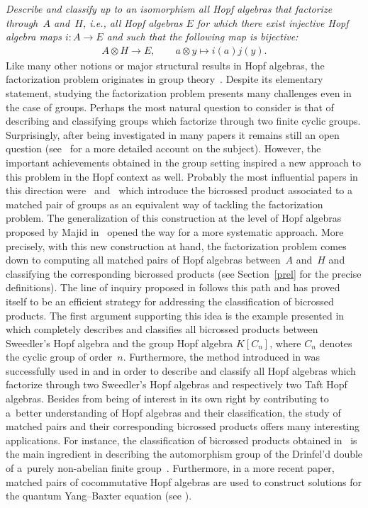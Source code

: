 \documentclass[10pt,a4paper]{amsart}
\numberwithin{equation}{section}
\begin{document}
\textit{Describe and classify up to an isomorphism all Hopf algebras that factorize through~$A$ and~$H$, i.e., all Hopf algebras $E$ for which there exist injective Hopf algebra maps $i\colon A \to E$ and  such that the following map is bijective:}
\begin{gather*}
A \otimes H \to E, \qquad a \otimes y \mapsto i(a) j(y).
\end{gather*}
Like many other notions or major structural results in Hopf algebras, the factorization problem originates in group theory~\cite{Ore}. Despite its elementary statement, studying the factorization problem presents many challenges even in the case of groups. Perhaps the most natural question to consider is that of describing and classifying groups which factorize through two finite cyclic groups. Surprisingly, after being investigated in
many papers it remains still an open question (see~\cite{acim} for a more detailed account on the subject). However, the important achievements obtained in the group setting inspired a new approach to this problem in the Hopf context as well. Probably the most influential papers in this direction were~\cite{zappa} and~\cite{Takeuchi} which introduce the bicrossed product associated to a matched pair of groups as an equivalent way of tackling the factorization problem. The generalization of this construction at the level of Hopf algebras proposed by Majid in~\cite{majid}
opened the way for a more systematic approach. More precisely, with this new construction at hand, the factorization problem comes down to computing all matched pairs of Hopf algebras between~$A$ and~$H$ and classifying the corresponding bicrossed products (see Section~\ref{prel} for the precise definitions). The line of inquiry proposed in \cite{abm} follows this path and has proved itself to be an efficient strategy for addressing the
classification of bicrossed products. The first argument supporting this idea is the example presented in~\cite{abm} which completely describes and classifies all bicrossed products between Sweedler's Hopf algebra and the group Hopf algebra $K[C_{n}]$, where $C_n$ denotes the cyclic group of order~$n$. Furthermore, the method introduced in \cite{abm} was successfully used in \cite{Gabi} and \cite{aa} in order to describe and classify all
Hopf algebras which factorize through two Sweedler's Hopf algebras and respectively two Taft Hopf algebras. Besides from being of interest in its own right by contributing to a~better understan\-ding of Hopf algebras and their classification, the study of matched pairs and their corresponding bicrossed products offers many interesting applications. For instance, the classification of bicrossed products obtained in~\cite{abm} is the main ingredient in describing the automorphism group of the Drinfel'd double of a~purely non-abelian finite group~\cite{marc1}. Furthermore, in a more recent paper, matched pairs of cocommutative Hopf algebras are used to construct solutions for the quantum Yang--Baxter equation (see \cite[Proposition~3.2]{agv}).
\end{document}
